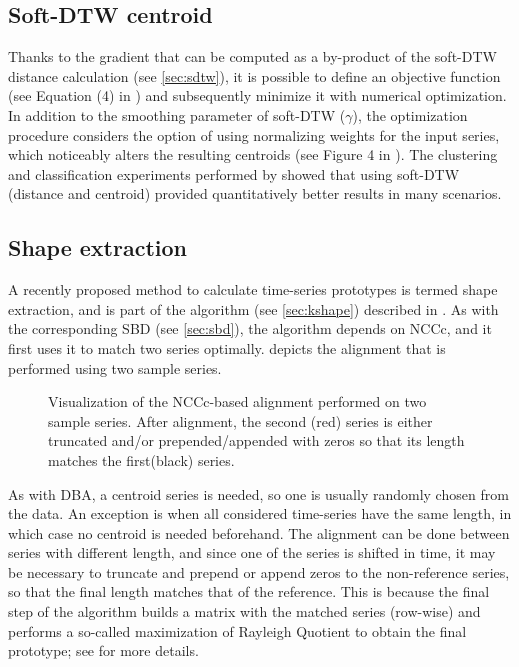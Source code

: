 \subsection{Soft-DTW centroid}
\label{sec:sdtw-cent}

Thanks to the gradient that can be computed as a by-product of the soft-DTW distance calculation
(see \cref{sec:sdtw}),
it is possible to define an objective function
(see Equation (4) in \citet{cuturi2017})
and subsequently minimize it with numerical optimization.
In addition to the smoothing parameter of soft-DTW ($\gamma$),
the optimization procedure considers the option of using normalizing weights for the input series,
which noticeably alters the resulting centroids
(see Figure 4 in \citet{cuturi2017}).
The clustering and classification experiments performed by \citet{cuturi2017} showed that using soft-DTW (distance and centroid) provided quantitatively better results in many scenarios.

\subsection{Shape extraction}
\label{sec:shape}

A recently proposed method to calculate time-series prototypes is termed shape extraction,
and is part of the \kshape{} algorithm (see \cref{sec:kshape}) described in \citet{paparrizos2015}.
As with the corresponding SBD (see \cref{sec:sbd}),
the algorithm depends on NCCc,
and it first uses it to match two series optimally.
 depicts the alignment that is performed using two sample series.

\begin{figure}[htbp]

{\centering {}

}

\caption{Visualization of the NCCc-based alignment performed on two sample series. After alignment, the second (red) series is either truncated and/or prepended/appended with zeros so that its length matches the first(black) series.}\label{fig:sbd-alignment}
\end{figure}

As with DBA, a centroid series is needed,
so one is usually randomly chosen from the data.
An exception is when all considered time-series have the same length,
in which case no centroid is needed beforehand.
The alignment can be done between series with different length,
and since one of the series is shifted in time,
it may be necessary to truncate and prepend or append zeros to the non-reference series,
so that the final length matches that of the reference.
This is because the final step of the algorithm builds a matrix with the matched series (row-wise) and performs a so-called maximization of Rayleigh Quotient to obtain the final prototype;
see \citet{paparrizos2015} for more details.

